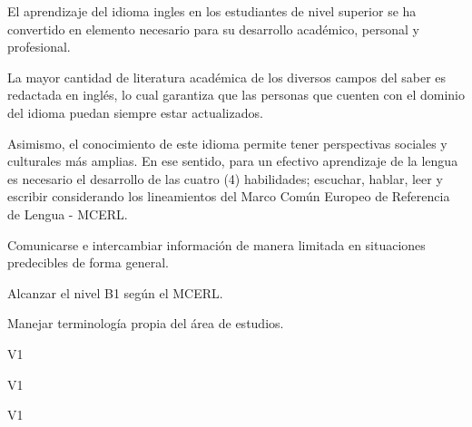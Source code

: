 \begin{syllabus}


\begin{justification}
El aprendizaje del idioma ingles en los estudiantes de nivel superior se ha 
convertido en elemento necesario para su desarrollo académico, personal y 
profesional. 

La mayor cantidad de literatura académica de los diversos campos del 
saber es redactada en inglés, lo cual garantiza que las personas que cuenten 
con el dominio del idioma puedan siempre estar actualizados. 

Asimismo, el conocimiento de este idioma permite tener perspectivas 
sociales y culturales más amplias. En ese sentido, para un efectivo 
aprendizaje de la lengua es necesario el desarrollo de 
las cuatro (4) habilidades; escuchar, hablar, leer y escribir 
considerando los lineamientos del 
Marco Común Europeo de Referencia de Lengua - MCERL.
\end{justification}

\begin{goals}
\item Comunicarse e intercambiar información de manera limitada en situaciones predecibles de forma general.
\item Alcanzar el nivel B1 según el MCERL.
\item Manejar terminología propia del área de estudios.
\end{goals}

\begin{outcomes}{V1}
\item {}
\end{outcomes}

\begin{specificoutcomes}{V1}
\item {}
\item {}
\item {}
\item {}
\end{specificoutcomes}

\begin{competences}{V1}
    \item {}
\end{competences}


\end{syllabus}

